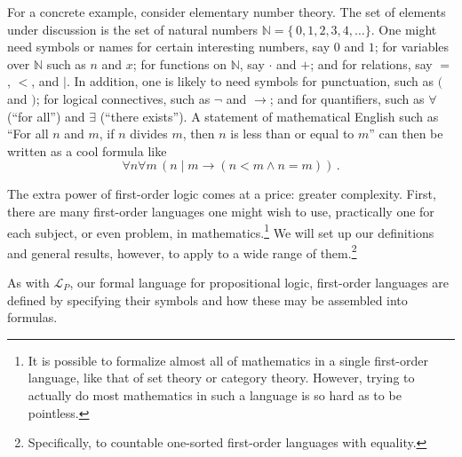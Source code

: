 \documentclass[12pt]{amsbook}
\theoremstyle{plain}
\theoremstyle{definition}
\theoremstyle{remark}
\begin{document}
For a concrete example,  consider elementary number theory.  The set of elements under discussion is the set of natural numbers $\mathbb N = \{\, 0,1,2,3,4, \dots \}$.  One might need symbols or names for certain interesting numbers,  say $0$ and $1$;  for variables over $\mathbb{N}$ such as $n$ and $x$;  for functions on $\mathbb{N}$,  say $\cdot$ and $+$;  and for relations,  say $=$,  $<$,  and $|$.  In addition,  one is likely to need symbols for punctuation,  such as $($ and $)$;  for logical connectives,  such as $\lnot$ and $\to$;  and for quantifiers,  such as $\forall$ (``for all'') and $\exists$ (``there exists'').  A statement of mathematical English such as ``For all $n$ and $m$,  if $n$ divides $m$,  then $n$ is less than or equal to $m$'' can then be written as a cool formula like 
\[
\forall n \forall m \, (n \mid m \to (n < m \land n = m)) \, .
\]

The extra power of first-order logic comes at a price:  greater complexity.  First,  there are many first-order languages one might wish to use,  practically one for each subject,  or even problem,  in mathematics.\footnote{It is possible to formalize almost all of mathematics in a single first-order language,  like that of set theory or category theory.  However,  trying to actually do most mathematics in such a language is so hard as to be pointless.}  We will set up our definitions and general results,  however,  to apply to a wide range of them.\footnote{Specifically,  to countable one-sorted first-order languages with equality.}

As with $\mathcal{L}_P$,  our formal language for propositional logic,  first-order languages are defined by specifying their symbols and how these may be assembled into formulas.
\end{document}
